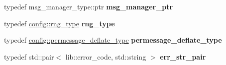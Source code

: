 \begin{DoxyCompactItemize}
typedef msg\+\_\+manager\+\_\+type\+::ptr {\bfseries msg\+\_\+manager\+\_\+ptr}
\item 
\mbox{\label{classwebsocketpp_1_1processor_1_1hybi13_ad6e55eeed8ec7329fb71abceb4159a5c}} 
typedef \mbox{\hyperlink{classwebsocketpp_1_1random_1_1none_1_1int__generator}{config\+::rng\+\_\+type}} {\bfseries rng\+\_\+type}
\item 
\mbox{\label{classwebsocketpp_1_1processor_1_1hybi13_a9e82fb49b851fa427f409aab42d7b6a9}} 
typedef \mbox{\hyperlink{classwebsocketpp_1_1extensions_1_1permessage__deflate_1_1disabled}{config\+::permessage\+\_\+deflate\+\_\+type}} {\bfseries permessage\+\_\+deflate\+\_\+type}
\item 
\mbox{\label{classwebsocketpp_1_1processor_1_1hybi13_a1ebac644e40640950b65782ccc39a33a}} 
typedef std\+::pair$<$ lib\+::error\+\_\+code, std\+::string $>$ {\bfseries err\+\_\+str\+\_\+pair}
\end{DoxyCompactItemize}
